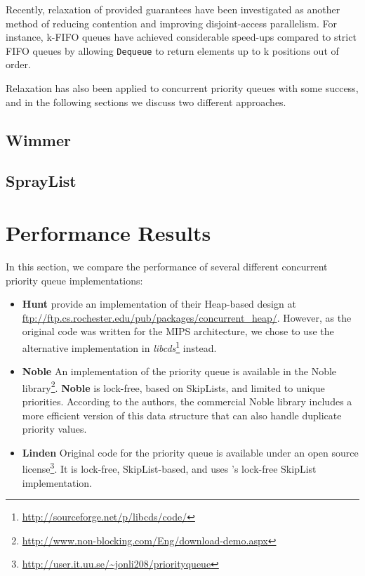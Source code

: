 \documentclass[a4paper,10pt]{article}
\begin{document}
Recently, relaxation of provided guarantees have been investigated as another method of reducing
contention and improving disjoint-access parallelism.
For instance, k-FIFO queues \cite{} have achieved considerable
speed-ups compared to strict FIFO queues by allowing \lstinline|Dequeue| to return elements
up to k positions out of order.

Relaxation has also been applied to concurrent priority queues with some success, and in the following
sections we discuss two different approaches.

\subsection{Wimmer} \label{sec:wimmer}
\subsection{SprayList} \label{sec:spraylist}

\section{Performance Results}

In this section, we compare the performance of several different concurrent priority
queue implementations:

\begin{itemize}
\item \textbf{Hunt} \citeauthor{hunt1996efficient} provide an implementation
      of their Heap-based design \cite{hunt1996efficient} at \url{ftp://ftp.cs.rochester.edu/pub/packages/concurrent_heap/}.
      However, as the original code was written for the MIPS architecture, we chose to
      use the alternative implementation in \emph{libcds}\footnote{\url{http://sourceforge.net/p/libcds/code/}}
      instead.
\item \textbf{Noble} An implementation of the \citeauthor{sundell2003fast} priority queue \cite{sundell2003fast}
      is available in the Noble library\footnote{\url{http://www.non-blocking.com/Eng/download-demo.aspx}}.
      \textbf{Noble} is lock-free, based on SkipLists, and limited to unique priorities.
      According to the authors, the commercial Noble library includes a more efficient
      version of this data structure that can also handle duplicate priority values.
\item \textbf{Linden} Original code for the \citeauthor{linden2013skiplist} priority queue \cite{linden2013skiplist}
      is available under an open source license\footnote{\url{http://user.it.uu.se/~jonli208/priorityqueue}}.
      It is lock-free, SkipList-based, and uses \citeauthor{fraser2004practical}'s lock-free
      SkipList implementation.
\end{itemize}
\end{document}
